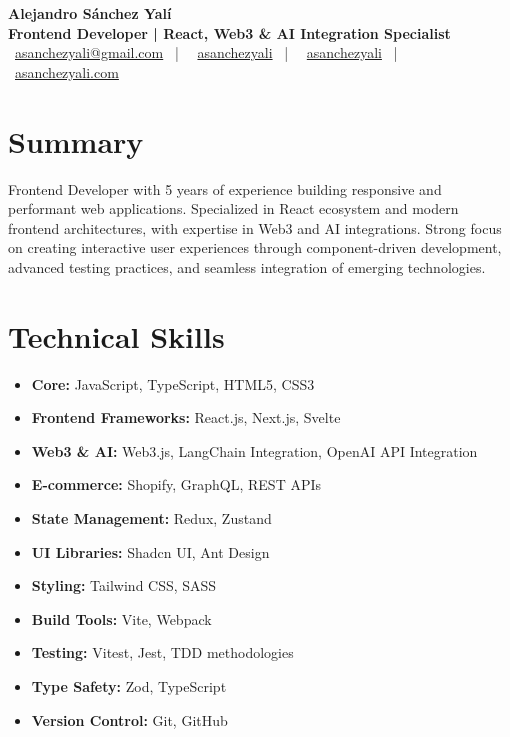 \documentclass[letterpaper,11pt]{article}
\begin{document}
\begin{center}
\textbf{\Huge Alejandro Sánchez Yalí}\\[0.3em]
\textbf{\Large Frontend Developer | React, Web3 \& AI Integration Specialist}\\[0.5em]
\small
\faEnvelope\ \href{mailto:asanchezyali@gmail.com}{asanchezyali@gmail.com}  ~|~
\faLinkedin\ \href{https://www.linkedin.com/in/asanchezyali}{asanchezyali} ~|~
\faGithub\ \href{https://github.com/asanchezyali}{asanchezyali}  ~|~
\faGlobe\ \href{https://asanchezyali.com}{asanchezyali.com}
\end{center}

\section{Summary}
Frontend Developer with 5 years of experience building responsive and performant web applications. Specialized in React ecosystem and modern frontend architectures, with expertise in Web3 and AI integrations. Strong focus on creating interactive user experiences through component-driven development, advanced testing practices, and seamless integration of emerging technologies.

\section{Technical Skills}
\begin{itemize}[leftmargin=*]
  \item \textbf{Core:} JavaScript, TypeScript, HTML5, CSS3
  \item \textbf{Frontend Frameworks:} React.js, Next.js, Svelte
  \item \textbf{Web3 \& AI:} Web3.js, LangChain Integration, OpenAI API Integration
  \item \textbf{E-commerce:} Shopify, GraphQL, REST APIs
  \item \textbf{State Management:} Redux, Zustand
  \item \textbf{UI Libraries:} Shadcn UI, Ant Design
  \item \textbf{Styling:} Tailwind CSS, SASS
  \item \textbf{Build Tools:} Vite, Webpack
  \item \textbf{Testing:} Vitest, Jest, TDD methodologies
  \item \textbf{Type Safety:} Zod, TypeScript
  \item \textbf{Version Control:} Git, GitHub
\end{itemize}
\end{document}
